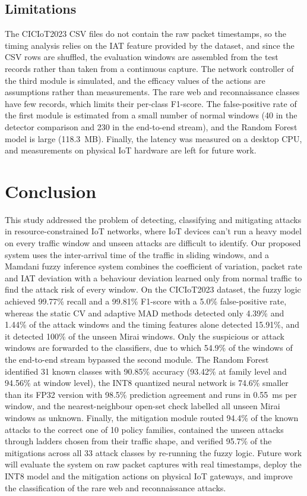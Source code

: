 \documentclass[]{interact}
\theoremstyle{plain}%
\theoremstyle{definition}
\theoremstyle{remark}
\begin{document}
\subsection{Limitations}
The CICIoT2023 CSV files do not contain the raw packet timestamps, so the timing analysis relies on the IAT feature provided by the dataset, and since the CSV rows are shuffled, the evaluation windows are assembled from the test records rather than taken from a continuous capture. The network controller of the third module is simulated, and the efficacy values of the actions are assumptions rather than measurements. The rare web and reconnaissance classes have few records, which limits their per-class F1-score. The false-positive rate of the first module is estimated from a small number of normal windows (40 in the detector comparison and 230 in the end-to-end stream), and the Random Forest model is large (118.3~MB). Finally, the latency was measured on a desktop CPU, and measurements on physical IoT hardware are left for future work.


\section{Conclusion}
This study addressed the problem of detecting, classifying and mitigating attacks in resource-constrained IoT networks, where IoT devices can't run a heavy model on every traffic window and unseen attacks are difficult to identify. Our proposed system uses the inter-arrival time of the traffic in sliding windows, and a Mamdani fuzzy inference system combines the coefficient of variation, packet rate and IAT deviation with a behaviour deviation learned only from normal traffic to find the attack risk of every window. On the CICIoT2023 dataset, the fuzzy logic achieved 99.77\% recall and a 99.81\% F1-score with a 5.0\% false-positive rate, whereas the static CV and adaptive MAD methods detected only 4.39\% and 1.44\% of the attack windows and the timing features alone detected 15.91\%, and it detected 100\% of the unseen Mirai windows. Only the suspicious or attack windows are forwarded to the classifiers, due to which 54.9\% of the windows of the end-to-end stream bypassed the second module. The Random Forest identified 31 known classes with 90.85\% accuracy (93.42\% at family level and 94.56\% at window level), the INT8 quantized neural network is 74.6\% smaller than its FP32 version with 98.5\% prediction agreement and runs in 0.55~ms per window, and the nearest-neighbour open-set check labelled all unseen Mirai windows as unknown. Finally, the mitigation module routed 94.4\% of the known attacks to the correct one of 10 policy families, contained the unseen attacks through ladders chosen from their traffic shape, and verified 95.7\% of the mitigations across all 33 attack classes by re-running the fuzzy logic. Future work will evaluate the system on raw packet captures with real timestamps, deploy the INT8 model and the mitigation actions on physical IoT gateways, and improve the classification of the rare web and reconnaissance attacks.
\end{document}

